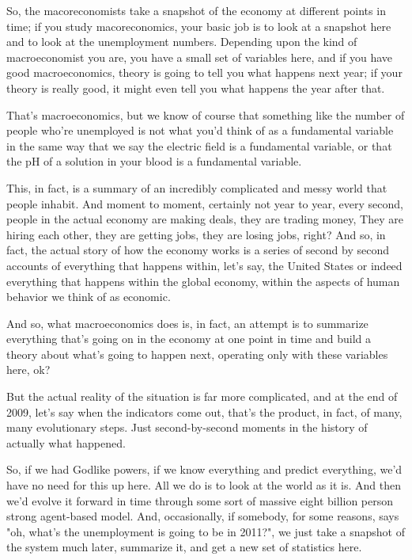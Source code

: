 \documentclass[]{article}
\begin{document}
So, the macoreconomists take  a snapshot of the economy at different points in time; if you study macoreconomics, your basic job is to look at a snapshot here
and to look at the unemployment numbers. Depending upon the kind of 
macroeconomist you are, you have a small set of variables here, and if you have good macroeconomics, theory is going to tell you what happens next year; if your theory is really good, it might even tell you what happens the year after that.

That's macroeconomics, but we know of course that something like the number of people who're unemployed is not what you'd think of as a fundamental variable in 
the same way that we say the electric field is a fundamental variable, or that the pH of a solution in your blood is a fundamental variable.

This, in fact, is a summary of an incredibly complicated 
and messy world that  people inhabit. And moment to moment, certainly not year to year, every second, people in the actual economy are making deals, they are trading money, They are hiring each other, they are getting jobs, they are losing jobs, right? And so, in fact, the actual story of how the economy works 
is a series of second by second accounts of everything 
that happens within, let's say, the United States 
or indeed everything that happens
within the global economy, 
within the aspects of human behavior 
we think of as economic.

And so, what macroeconomics 
does is, in fact, an attempt is to summarize everything
that's going on in the economy 
at one point in time and build a theory about what's going to happen next,
operating only with these 
variables here, ok?

But the actual reality of the 
situation is far more complicated,
and at the end of 2009, let's say 
when the indicators come out,
that's the product, in fact, of many, 
many evolutionary steps.
 Just second-by-second moments in 
the history of actually what happened.

So, if we had Godlike powers, if we
know everything and predict everything,
we'd have no need for this up here.
All we do is to look at 
the world as it is.
And then we'd evolve it 
forward in time
through some sort of massive eight
billion person strong agent-based model.
And, occasionally, if somebody, 
for some reasons, says
"oh, what's the unemployment
is going to be in 2011?",
we just take a snapshot of the 
system much later,
summarize it,
and get a new set of statistics here.
\end{document}
